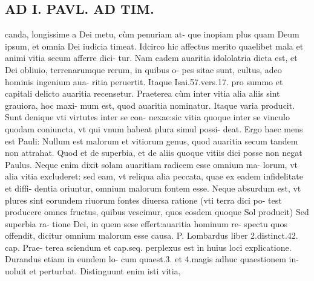 \documentclass{article}
\begin{document}
\begin{pages}
\section*{AD I. PAVL. AD TIM. }
\marginpar{[ p.454 ]}\pstart canda, longissime a Dei metu, cùm penuriam at- que inopiam plus quam Deum ipsum, et omnia Dei iudicia timeat. Idcirco hic affectus merito quaelibet mala et animi vitia secum afferre dici- tur. Nam eadem auaritia idololatria dicta est, et Dei obliuio, terrenarumque rerum, in quibus o- pes sitae sunt, cultus, adeo hominis ingenium aua- ritia peruertit. Itaque Isai.57.vers.17. pro summo et capitali delicto auaritia recensetur. Praeterea cùm inter vitia alia aliis sint grauiora, hoc maxi- mum est, quod auaritia nominatur. Itaque varia producit. Sunt denique vti virtutes inter se con- nexae:sic vitia quoque inter se vinculo quodam coniuncta, vt qui vnum habeat plura simul possi- deat. Ergo haec mens est Pauli: Nullum est malorum et vitiorum genus, quod auaritia secum tandem non attrahat. Quod et de superbia, et de aliis quoque  vitiis dici posse non negat Paulus. Neque enim dixit solam auaritiam radicem esse omnium ma- lorum, vt alia vitia excluderet: sed eam, vt reliqua alia peccata, quae ex eadem infidelitate et diffi- dentia oriuntur, omnium malorum fontem esse. Neque absurdum est, vt plures sint eorundem riuorum fontes diuersa ratione (vti terra dici po- test producere omnes fructus, quibus vescimur, quos eosdem quoque  Sol producit) Sed superbia ra- tione Dei, in quem sese effert:auaritia hominum re- spectu quos offendit, dicitur omnium malorum esse causa. P. Lombardus liber 2.distinct.42. cap. Prae- terea sciendum et cap.seq. perplexus est in huius loci explicatione. Durandus etiam in eundem lo- cum quaest.3. et 4.magis adhuc quaestionem in- uoluit et perturbat. Distinguunt enim isti vitia,  \pend

\end{pages}
\end{document}
